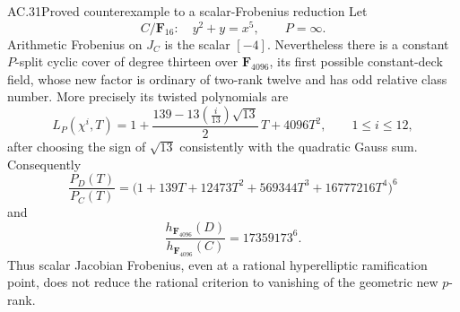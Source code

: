 \begin{claim}{AC.31}{Proved counterexample to a scalar-Frobenius reduction}
Let
\[
 C/\mathbf F_{16}:\quad y^2+y=x^5,\qquad P=\infty.
\]
Arithmetic Frobenius on \(J_C\) is the scalar \([-4]\).
Nevertheless there is a constant \(P\)-split cyclic cover of degree
thirteen over \(\mathbf F_{4096}\), its first possible constant-deck
field, whose new factor is ordinary of two-rank twelve and has odd
relative class number. More precisely its twisted polynomials are
\[
 L_P(\chi^i,T)
 =1+\frac{139-13\left(\frac{i}{13}\right)\sqrt{13}}2\,T
       +4096T^2,\qquad 1\le i\le12,
\]
after choosing the sign of \(\sqrt{13}\) consistently with the
quadratic Gauss sum. Consequently
\[
 \frac{P_D(T)}{P_C(T)}
 =\bigl(1+139T+12473T^2+569344T^3+16777216T^4\bigr)^6
\]
and
\[
 \frac{h_{\mathbf F_{4096}}(D)}{h_{\mathbf F_{4096}}(C)}
                         =17359173^6.
\]
Thus scalar Jacobian Frobenius, even at a rational hyperelliptic
ramification point, does not reduce the rational criterion to
vanishing of the geometric new \(p\)-rank.
\end{claim}
